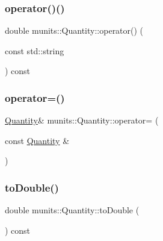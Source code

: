 \mbox{\label{classmunits_1_1_quantity_ac9e9f65483a14ec729bb684d629091bc}} 
\subsubsection{\texorpdfstring{operator()()}{operator()()}}
{\footnotesize\ttfamily double munits\+::\+Quantity\+::operator() (\begin{DoxyParamCaption}\item[{const std\+::string}]{ }\end{DoxyParamCaption}) const}

\mbox{\label{classmunits_1_1_quantity_af77fd9cb9469a6b71c8a27004f5dabe4}} 
\subsubsection{\texorpdfstring{operator=()}{operator=()}}
{\footnotesize\ttfamily \hyperlink{classmunits_1_1_quantity}{Quantity}\& munits\+::\+Quantity\+::operator= (\begin{DoxyParamCaption}\item[{const \hyperlink{classmunits_1_1_quantity}{Quantity} \&}]{ }\end{DoxyParamCaption})\hspace{0.3cm}{\ttfamily [default]}}

\mbox{\label{classmunits_1_1_quantity_aadf35d14997bb3e58d8d2681f7c24ae3}} 
\subsubsection{\texorpdfstring{to\+Double()}{toDouble()}}
{\footnotesize\ttfamily double munits\+::\+Quantity\+::to\+Double (\begin{DoxyParamCaption}{ }\end{DoxyParamCaption}) const\hspace{0.3cm}{\ttfamily [inline]}}


